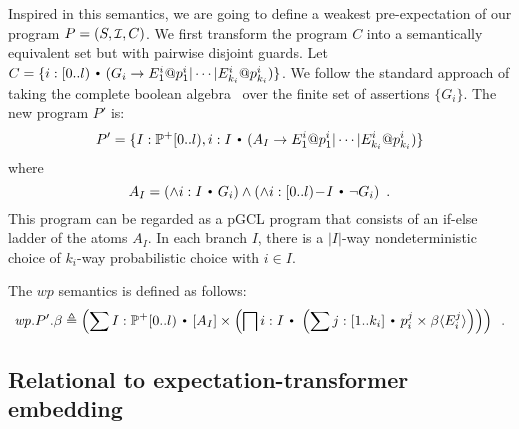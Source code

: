 \documentclass{eptcs}
\theoremstyle{plain}
\theoremstyle{definition}
\newcommand{\lit}[1]{\ensuremath{\mathit{#1}}}
\newcommand{\Prg}{P}
\newcommand{\Init}{\mbox{\small\ensuremath{\mathcal{I}}}}
\newcommand{\CGs}{C}
\newcommand{\Def}{\ensuremath{\triangleq}}
\newcommand{\Subst}[2][]
	{ \ensuremath{\ifthenelse{\equal{#1}{}}{\langle #2 \rangle}{\langle #1\mapsto #2 \rangle} }}
\newcommand{\ra}{\ensuremath{\rightarrow}}
\newcommand{\dotsep}{\mbox{\raisebox{0.4ex}{\tiny\ensuremath{\:\;\bullet\;\:}}}}
\newcommand{\Wp}{\lit{wp}}
\newcommand{\remark}[2]{}
\newcommand{\remarkN}[1]{\remark{N}{#1}}
\begin{document}
\sloppy Inspired in this semantics, we are going to define a weakest pre-expectation of our program \mbox{$\Prg = (S, \Init, \CGs)$}.
We first transform the program $\CGs$ into a semantically equivalent set but with pairwise disjoint guards.
Let $\CGs = \{ i:[0..l) \dotsep (G_i \ra  E^i_1 @ p^i_1 | \cdots | E^i_{k_i} @ p^i_{k_i} ) \}$.
We follow the standard approach of taking the complete boolean algebra~\cite{IntroductionLatticeOrderBook} over the finite set of assertions $\{ G_i \}$.
The new program $\Prg'$ is:
\[ \Prg' = \{ I:\PowerNonEmpty{[0..l)}, i:I \dotsep (A_I \ra  E^i_1 @ p^i_1 | \cdots | E^i_{k_i} @ p^i_{k_i} ) \} \]
where
\begin{equation} \label{eq:guard_atoms} 
A_I = (\land i:I \dotsep G_i) \land (\land i:[0..l)\!-\!I \dotsep \neg G_i)\enspace.
\end{equation}
This program can be regarded as a pGCL program that consists of an if-else ladder of the atoms $A_I$.
In each branch $I$, there is a $|I|$-way nondeterministic choice of $k_i$-way probabilistic choice with $i\in I$.
\remarkN{notar que no puedo hacer sub-prob con los constructores estandar}
The $\Wp$ semantics is defined as follows:
\begin{equation}
\label{eq:wp_sint}
\Wp{}.\Prg'.\beta \Def \left( \sum I:\PowerNonEmpty[0..l) \dotsep
	[A_I] \times \left( \bigsqcap i:I \dotsep
				\left( \sum j:[1..k_i] \dotsep p_i^j\times \beta\Subst{E_i^j} \right)
			  \right)
\right)\enspace.
\end{equation}


\subsection{Relational to expectation-transformer embedding}
\end{document}
